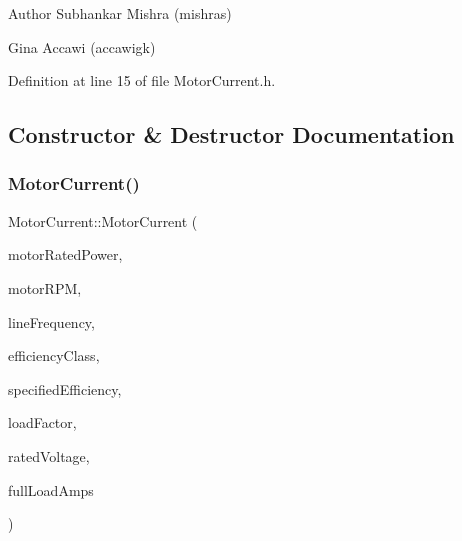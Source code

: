 \begin{DoxyAuthor}{Author}
Subhankar Mishra (mishras) 

Gina Accawi (accawigk) 
\end{DoxyAuthor}


Definition at line 15 of file Motor\+Current.\+h.



\subsection{Constructor \& Destructor Documentation}
\mbox{\label{class_motor_current_a099860ac4021ce07ec5b033b3bcf37e4}} 
\subsubsection{\texorpdfstring{Motor\+Current()}{MotorCurrent()}}
{\footnotesize\ttfamily Motor\+Current\+::\+Motor\+Current (\begin{DoxyParamCaption}\item[{double}]{motor\+Rated\+Power,  }\item[{double}]{motor\+R\+PM,  }\item[{\hyperlink{class_motor_acee1bdf1b684ad36cb80dc2829d9fcee}{Motor\+::\+Line\+Frequency}}]{line\+Frequency,  }\item[{\hyperlink{class_motor_afa022971ae062406a9f588c601673d4e}{Motor\+::\+Efficiency\+Class}}]{efficiency\+Class,  }\item[{double}]{specified\+Efficiency,  }\item[{double}]{load\+Factor,  }\item[{double}]{rated\+Voltage,  }\item[{double}]{full\+Load\+Amps }\end{DoxyParamCaption})\hspace{0.3cm}{\ttfamily [inline]}}


